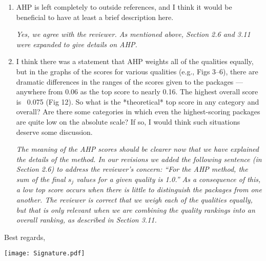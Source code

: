 \documentclass[12pt]{casletter}
\begin{document}
\begin{letter}
\begin{enumerate}
  \item AHP is left completely to outside references, and I think it would be
  beneficial to have at least a brief description here. \medskip

    \emph{Yes, we agree with the reviewer.  As mentioned above, Section 2.6 and 3.11 were expanded to give details on AHP. \smallskip}

  \item I think there was a statement that AHP weights all of the qualities
  equally, but in the graphs of the scores for various qualities (e.g., Figs
  3--6), there are dramatic differences in the ranges of the scores given to the
  packages --- anywhere from 0.06 as the top score to nearly 0.16.  The highest
  overall score is ~0.075 (Fig 12). So what is the *theoretical* top score in
  any category and overall?  Are there some categories in which even the
  highest-scoring packages are quite low on the absolute scale?  If so, I would
  think such situations deserve some discussion. \medskip

    \emph{The meaning of the AHP scores should be clearer now that we have
    explained the details of the method.  In our revisions we added the
    following sentence (in Section 2.6) to address the reviewer's concern: ``For
    the AHP method, the sum of the final $s_j$ values for a given quality is
    1.0.''  As a consequence of this, a low top score occurs when there is
    little to distinguish the packages from one another.  The reviewer is
    correct that we weigh each of the qualities equally, but that is only
    relevant when we are combining the quality rankings into an overall ranking,
    as described in Section 3.11. \smallskip}

  \end{enumerate}

  \closing{Best regards,~\newline} \vspace{-29mm}
  \texttt{[image: Signature.pdf]}

\end {letter}
\end{document}
